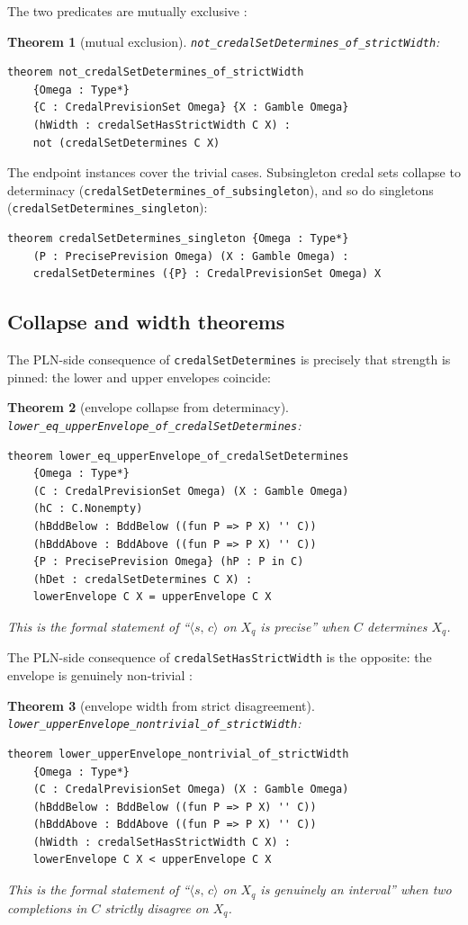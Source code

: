 \documentclass[]{article}
\newtheorem{theorem}{Theorem}
\newcommand{\lid}[1]{{\ttfamily\nolinkurl{#1}}}
\newcommand{\STV}[2]{\langle #1,\, #2 \rangle}
\begin{document}
The two predicates are mutually exclusive :
\begin{theorem}[mutual exclusion]\label{thm:mutex}
\lid{not\_credalSetDetermines\_of\_strictWidth}:
\begin{lstlisting}
theorem not_credalSetDetermines_of_strictWidth
    {Omega : Type*}
    {C : CredalPrevisionSet Omega} {X : Gamble Omega}
    (hWidth : credalSetHasStrictWidth C X) :
    not (credalSetDetermines C X)
\end{lstlisting}
\end{theorem}

The endpoint instances cover the trivial cases. Subsingleton credal sets
collapse to determinacy
(\lid{credalSetDetermines\_of\_subsingleton}), and so do
singletons (\lid{credalSetDetermines\_singleton}):
\begin{lstlisting}
theorem credalSetDetermines_singleton {Omega : Type*}
    (P : PrecisePrevision Omega) (X : Gamble Omega) :
    credalSetDetermines ({P} : CredalPrevisionSet Omega) X
\end{lstlisting}

\subsection{Collapse and width theorems}

The PLN-side consequence of \lid{credalSetDetermines} is precisely
that strength is pinned: the lower and upper envelopes coincide:
\begin{theorem}[envelope collapse from determinacy]\label{thm:collapse}
\lid{lower\_eq\_upperEnvelope\_of\_credalSetDetermines}:
\begin{lstlisting}
theorem lower_eq_upperEnvelope_of_credalSetDetermines
    {Omega : Type*}
    (C : CredalPrevisionSet Omega) (X : Gamble Omega)
    (hC : C.Nonempty)
    (hBddBelow : BddBelow ((fun P => P X) '' C))
    (hBddAbove : BddAbove ((fun P => P X) '' C))
    {P : PrecisePrevision Omega} (hP : P in C)
    (hDet : credalSetDetermines C X) :
    lowerEnvelope C X = upperEnvelope C X
\end{lstlisting}
This is the formal statement of ``$\STV{s}{c}$ on $X_q$ is precise''
when $C$ determines $X_q$.
\end{theorem}

The PLN-side consequence of \lid{credalSetHasStrictWidth} is the opposite:
the envelope is genuinely non-trivial :
\begin{theorem}[envelope width from strict disagreement]\label{thm:width}
\lid{lower\_upperEnvelope\_nontrivial\_of\_strictWidth}:
\begin{lstlisting}
theorem lower_upperEnvelope_nontrivial_of_strictWidth
    {Omega : Type*}
    (C : CredalPrevisionSet Omega) (X : Gamble Omega)
    (hBddBelow : BddBelow ((fun P => P X) '' C))
    (hBddAbove : BddAbove ((fun P => P X) '' C))
    (hWidth : credalSetHasStrictWidth C X) :
    lowerEnvelope C X < upperEnvelope C X
\end{lstlisting}
This is the formal statement of ``$\STV{s}{c}$ on $X_q$ is genuinely an
interval'' when two completions in $C$ strictly disagree on $X_q$.
\end{theorem}
\end{document}
